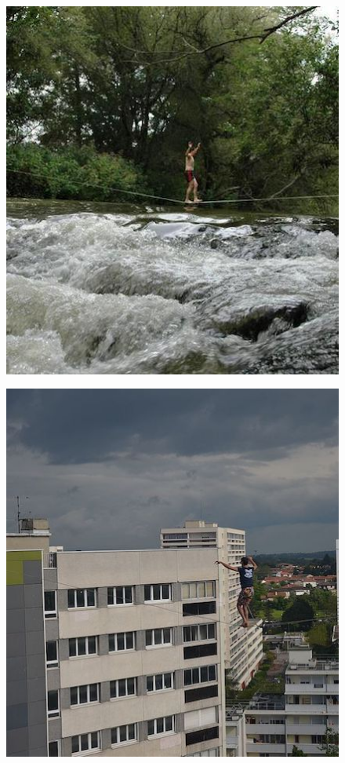 \begin{figure}[htb]
	\centering
	\begin{minipage}[t]{0.45\linewidth}
		\centering
		\includegraphics[width=1\linewidth]{Pictures/3_1_waterline}
		\label{fig:waterline}
	\end{minipage}
	\hfill
	\begin{minipage}[t]{0.45\linewidth}
		\centering
		\includegraphics[width=1\linewidth]{Pictures/3_1_urbanline}

\end{minipage}
\end{figure}
